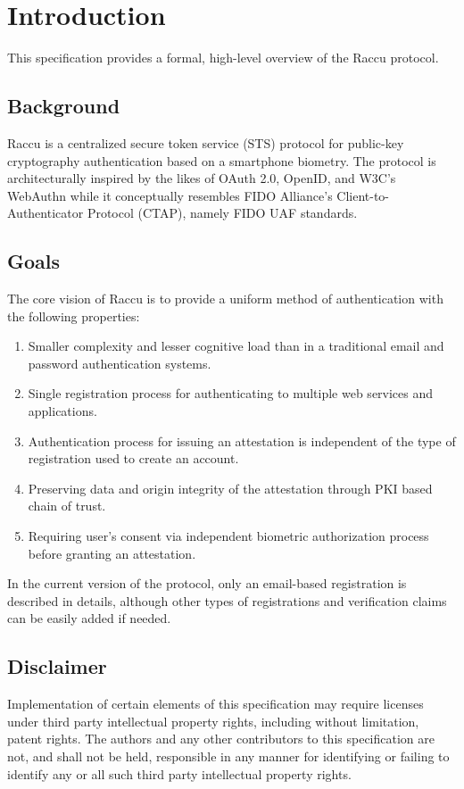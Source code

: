 \section{Introduction}
This specification provides a formal, high-level overview of the Raccu protocol. 

    \subsection{Background}
    Raccu is a centralized secure token service (STS) protocol for public-key cryptography authentication 
    based on a smartphone biometry. The protocol is architecturally inspired by the likes of OAuth 2.0, OpenID, 
    and W3C's WebAuthn while it conceptually resembles FIDO Alliance's Client-to-Authenticator Protocol (CTAP), 
    namely FIDO UAF standards.

    \subsection{Goals}
    The core vision of Raccu is to provide a uniform method of authentication with the following properties: 
        \begin{enumerate}
            \item Smaller complexity and lesser cognitive load than in a traditional email and password 
                  authentication systems.
            \item Single registration process for authenticating to multiple web services and applications.
            \item Authentication process for issuing an attestation is independent of the type of registration 
                  used to create an account.
            \item Preserving data and origin integrity of the attestation through PKI based chain of trust.
            \item Requiring user's consent via independent biometric authorization process before granting an 
                  attestation.
        \end{enumerate}
    In the current version of the protocol, only an email-based registration is described in details, although 
    other types of registrations and verification claims can be easily added if needed.

    \subsection{Disclaimer}
    Implementation of certain elements of this specification may require licenses under third party intellectual 
    property rights, including without limitation, patent rights. The authors and any other contributors to this 
    specification are not, and shall not be held, responsible in any manner for identifying or failing to identify 
    any or all such third party intellectual property rights.    
    
